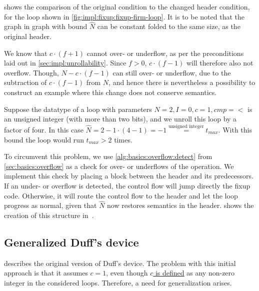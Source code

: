  shows the comparison of the original condition to the changed header condition, for the loop shown in \cref{fig:impl:fixup:fixup-firm-loop}.
It is to be noted that the graph in graph with bound $\hat{N}$ can be constant folded to the same size, as the original header.





We know that $c \cdot (f + 1)$ cannot over- or underflow, as per the preconditions laid out in \cref{sec:impl:unrollability}.
Since $f > 0$, $c \cdot (f - 1)$ will therefore also not overflow.
Though, $N - c \cdot (f - 1)$ can still over- or underflow, due to the subtraction of $c \cdot (f - 1)$ from $N$, and hence there is nevertheless a possibility to construct an example where this change does not conserve semantics.

Suppose the datatype of a loop with parameters $N = 2, I = 0, c = 1, cmp = <$ is an unsigned integer (with more than two bits), and we unroll this loop by a factor of four.
In this case $\hat{N} = 2 - 1 \cdot (4 - 1) = -1 \overset{\text{unsigned integer}}{=} t_{max}$.
With this bound the loop would run $t_{max} > 2$ times.

To circumvent this problem, we use \cref{alg:basics:overflow:detect} from \cref{sec:basics:overflow} as a check for over- or underflows of the operation.
We implement this check by placing a block between the header and its predecessors.
If an under- or overflow is detected, the control flow will jump directly the fixup code.
Otherwise, it will route the control flow to the header and let the loop progress as normal, given that $\hat{N}$ now restores semantics in the header.
 shows the creation of this structure in~\libFIRM.



\newpage

\subsection{Generalized Duff's device}\label{sec:impl:fixup:duff}

 describes the original version of Duff's device.
The problem with this initial approach is that it assumes $c = 1$, even though \hyperref[sec:impl::def-c]{$c$ is defined} as any non-zero integer in the considered loops.
Therefore, a need for generalization arises.

